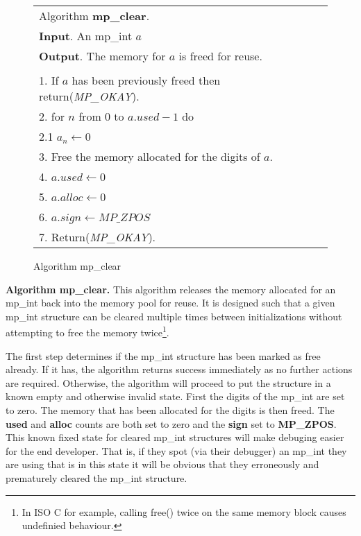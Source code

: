 \documentclass[b5paper]{book}
\begin{document}
\begin{figure}[here]
\begin{center}
\begin{tabular}{l}
\hline Algorithm \textbf{mp\_clear}. \\
\textbf{Input}.   An mp\_int $a$ \\
\textbf{Output}.  The memory for $a$ is freed for reuse.  \\
\hline \\
1.  If $a$ has been previously freed then return(\textit{MP\_OKAY}). \\
2.  for $n$ from 0 to $a.used - 1$ do \\
\hspace{3mm}2.1  $a_n \leftarrow 0$ \\
3.  Free the memory allocated for the digits of $a$. \\
4.  $a.used \leftarrow 0$ \\
5.  $a.alloc \leftarrow 0$ \\
6.  $a.sign \leftarrow MP\_ZPOS$ \\
7.  Return(\textit{MP\_OKAY}). \\
\hline
\end{tabular}
\end{center}
\caption{Algorithm mp\_clear}
\end{figure}

\textbf{Algorithm mp\_clear.}
This algorithm releases the memory allocated for an mp\_int back into the memory pool for reuse.  It is designed
such that a given mp\_int structure can be cleared multiple times between initializations without attempting to 
free the memory twice\footnote{In ISO C for example, calling free() twice on the same memory block causes undefinied
behaviour.}.  

The first step determines if the mp\_int structure has been marked as free already.  If it has, the algorithm returns
success immediately as no further actions are required.  Otherwise, the algorithm will proceed to put the structure 
in a known empty and otherwise invalid state.  First the digits of the mp\_int are set to zero.  The memory that has been allocated for the 
digits is then freed.  The \textbf{used} and \textbf{alloc} counts are both set to zero and the \textbf{sign} set to 
\textbf{MP\_ZPOS}.  This known fixed state for cleared mp\_int structures will make debuging easier for the end 
developer.  That is, if they spot (via their debugger) an mp\_int they are using that is in this state it will be 
obvious that they erroneously and prematurely cleared the mp\_int structure.
\end{document}
